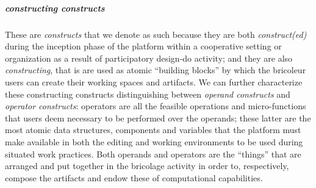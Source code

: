 \documentclass{article}
\begin{document}
\subparagraph{constructing constructs} These are \emph{constructs} that we denote as such because they are both \emph{construct(ed)} during the inception phase of the platform within a cooperative setting or organization as a result of participatory design-do activity; and they are also \emph{constructing}, that is are used as atomic ``building blocks'' by which the bricoleur users can create their working spaces and artifacts. We can further characterize these constructing constructs distinguishing between \emph{operand constructs} and \emph{operator constructs}: operators are all the feasible operations and micro-functions that users deem necessary to be performed over the operands; these latter are the most atomic data structures, components and variables that the platform must make available in both the editing and working environments to be used during situated work practices. Both operands and operators are the ``things'' that are arranged and put together in the bricolage activity in order to, respectively, compose the artifacts and endow these of computational capabilities.
\end{document}
